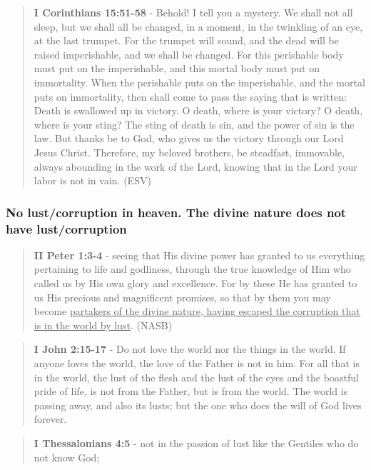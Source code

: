 \documentclass[11pt]{article}
\begin{document}
\begin{quote}
\textbf{I Corinthians 15:51-58} - Behold! I tell you a mystery. We shall not all sleep, but we shall all be changed, in a moment, in the twinkling of an eye, at the last trumpet. For the trumpet will sound, and the dead will be raised imperishable, and we shall be changed. For this perishable body must put on the imperishable, and this mortal body must put on immortality. When the perishable puts on the imperishable, and the mortal puts on immortality, then shall come to pass the saying that is written: Death is swallowed up in victory. O death, where is your victory? O death, where is your sting? The sting of death is sin, and the power of sin is the law. But thanks be to God, who gives us the victory through our Lord Jesus Christ. Therefore, my beloved brothers, be steadfast, immovable, always abounding in the work of the Lord, knowing that in the Lord your labor is not in vain. (ESV)
\end{quote}

\subsubsection{No lust/corruption in heaven. The divine nature does not have lust/corruption}
\label{sec:orgf8c1879}
\begin{quote}
\textbf{II Peter 1:3-4} - seeing that His divine power has granted to us everything pertaining to life and godliness, through the true knowledge of Him who called us by His own glory and excellence. For by these He has granted to us His precious and magnificent promises, so that by them you may become \uline{partakers of the divine nature, having escaped the corruption that is in the world by lust}. (NASB)
\end{quote}

\begin{quote}
\textbf{I John 2:15-17} - Do not love the world nor the things in the world. If anyone loves the world, the love of the Father is not in him. For all that is in the world, the lust of the flesh and the lust of the eyes and the boastful pride of life, is not from the Father, but is from the world. The world is passing away, and also its lusts; but the one who does the will of God lives forever.
\end{quote}

\begin{quote}
\textbf{I Thessalonians 4:5} - not in the passion of lust like the Gentiles who do not know God;
\end{quote}
\end{document}
